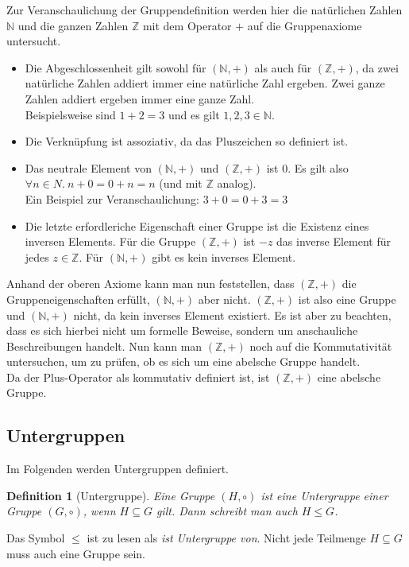\documentclass[12pt,a4paper, usenames, dvipsnames]{article}
\newtheorem{definition}{Definition}
\begin{document}
Zur Veranschaulichung der Gruppendefinition werden hier die natürlichen Zahlen $\mathbb{N}$ und die ganzen Zahlen $\mathbb{Z}$ mit dem Operator $+$ auf die Gruppenaxiome untersucht.
\begin{itemize}
\item Die Abgeschlossenheit gilt sowohl für $(\mathbb{N},+)$ als auch für $(\mathbb{Z},+)$, da zwei natürliche Zahlen addiert immer eine natürliche Zahl ergeben. Zwei ganze Zahlen addiert ergeben immer eine ganze Zahl. \\
Beispielsweise sind $1+2=3$ und es gilt $1,2,3 \in \mathbb{N}$.
\item Die Verknüpfung ist assoziativ, da das Pluszeichen so definiert ist.
\item Das neutrale Element von $(\mathbb{N},+)$ und $(\mathbb{Z},+)$ ist $0$. Es gilt also $\forall n \in N. \ n + 0 = 0 + n = n$ (und mit $\mathbb{Z}$ analog). \\
Ein Beispiel zur Veranschaulichung: $3+0=0+3=3$
\item Die letzte erfordleriche Eigenschaft einer Gruppe ist die Existenz eines inversen Elements. Für die Gruppe $(\mathbb{Z},+)$ ist $-z$ das inverse Element für jedes $z \in \mathbb{Z}$. Für $(\mathbb{N},+)$ gibt es kein inverses Element.
\end{itemize}
Anhand der oberen Axiome kann man nun feststellen, dass $(\mathbb{Z},+)$ die Gruppeneigenschaften erfüllt, $(\mathbb{N},+)$ aber nicht. 
$(\mathbb{Z},+)$ ist also eine Gruppe und $(\mathbb{N},+)$ nicht, da kein inverses Element existiert. 
Es ist aber zu beachten, dass es sich hierbei nicht um formelle Beweise, sondern um anschauliche Beschreibungen handelt.
Nun kann man $(\mathbb{Z},+)$ noch auf die Kommutativität untersuchen, um zu prüfen, ob es sich um eine abelsche Gruppe handelt. \\
Da der Plus-Operator als kommutativ definiert ist, ist $(\mathbb{Z},+)$ eine abelsche Gruppe.

%
%
%
%
%
%
%
%
%
%
\subsection*{Untergruppen} 

Im Folgenden werden Untergruppen definiert.

\begin{singlespacing}
\begin{definition}[Untergruppe]
Eine Gruppe $(H, \circ)$ ist eine Untergruppe einer Gruppe $(G, \circ)$, wenn $H \subseteq G$ gilt. Dann schreibt man auch $H \leqslant G$. 
\end{definition}
\end{singlespacing}
Das Symbol $\leqslant$ ist zu lesen als \textit{ist Untergruppe von}. Nicht jede Teilmenge $H \subseteq G$ muss auch eine Gruppe sein.
\end{document}

